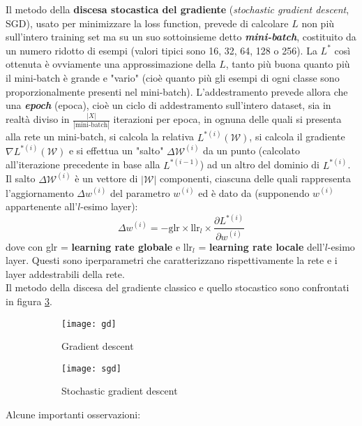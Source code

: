 Il metodo della \textbf{discesa stocastica del gradiente} (\textit{stochastic gradient descent}, SGD), usato per minimizzare la loss function, prevede di calcolare $L$ non più sull'intero training set ma su un suo sottoinsieme detto \textbf{\textit{mini-batch}}, costituito da un numero ridotto di esempi (valori tipici sono 16, 32, 64, 128 o 256). La $L^{*}$ così ottenuta è ovviamente una approssimazione della $L$, tanto più buona quanto più il mini-batch è grande e "vario" (cioè quanto più gli esempi di ogni classe sono proporzionalmente presenti nel mini-batch). L'addestramento prevede allora che una \textbf{\textit{epoch}} (epoca), cioè un ciclo di addestramento sull'intero dataset, sia in realtà diviso in $\frac{|X|}{|\text{mini-batch}|}$ iterazioni per epoca, in ognuna delle quali si presenta alla rete un mini-batch, si calcola la relativa $L^{*(i)}(\mathcal{W})$, si calcola il gradiente $\nabla L^{*(i)}(\mathcal{W})$ e si effettua un "salto" $\Delta \mathcal{W}^{(i)}$ da un punto (calcolato all'iterazione precedente in base alla $L^{*(i-1)}$) ad un altro del dominio di $L^{*(i)}$. Il salto $\Delta \mathcal{W}^{(i)}$ è un vettore di $|\mathcal{W}|$ componenti, ciascuna delle quali rappresenta l'aggiornamento $\Delta w^{(i)}$ del parametro $w^{(i)}$ ed è dato da (supponendo $w^{(i)}$ appartenente all'$l$-esimo layer):
\[
\Delta w^{(i)}=-\text{glr}\times \text{llr}_l\times \frac{\partial L^{*(i)}}{\partial w^{(i)}}
\]
dove con glr = \textbf{learning rate globale} e $\text{llr}_l$ = \textbf{learning rate locale} dell'$l$-esimo layer. Questi sono iperparametri che caratterizzano rispettivamente la rete e i layer addestrabili della rete.\\

Il metodo della discesa del gradiente classico e quello stocastico sono confrontati in figura \ref{fig:gdConfronto}.

\begin{figure}[h!]
\centering
\begin{subfigure}[b]{0.48\textwidth}
\texttt{[image: gd]}
\caption{Gradient descent}
\label{fig:gd}
\end{subfigure}
\begin{subfigure}[b]{0.48\textwidth}
\texttt{[image: sgd]}
\caption{Stochastic gradient descent}
\label{fig:sgd}
\end{subfigure}
\caption{}
\label{fig:gdConfronto}
\end{figure}

\noindent Alcune importanti osservazioni:

